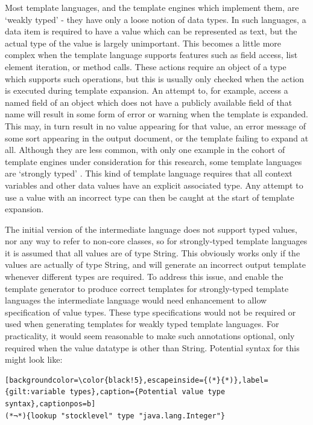 Most template languages, and the template engines which implement them, are `weakly typed' - they have only a loose notion of data types. In such languages, a data item is required to have a value which can be represented as text, but the actual type of the value is largely unimportant. This becomes a little more complex when the template language supports features such as field access, list element iteration, or method calls. These actions require an object of a type which supports such operations, but this is usually only checked when the action is executed during template expansion. An attempt to, for example, access a named field of an object which does not have a publicly available field of that name will result in some form of error or warning when the template is expanded. This may, in turn result in no value appearing for that value, an error message of some sort appearing in the output document, or the template failing to expand at all. Although they are less common, with only one example in the cohort of template engines under consideration for this research, some template languages are `strongly typed' \citep{Fokkinga1981} \citep{Madsen1990}. This kind of template language requires that all context variables and other data values have an explicit associated type. Any attempt to use a value with an incorrect type can then be caught at the start of template expansion.

The initial version of the intermediate language does not support typed values, nor any way to refer to non-core classes, so for strongly-typed template languages it is assumed that all values are of type String. This obviously works only if the values are actually of type String, and will generate an incorrect output template whenever different types are required. To address this issue, and enable the template generator to produce correct templates for strongly-typed template languages the intermediate language would need enhancement to allow specification of value types. These type specifications would not be required or used when generating templates for weakly typed template languages. For practicality, it would seem reasonable to make such annotations optional, only required when the value datatype is other than String. Potential syntax for this might look like:

\begin{lstlisting}[backgroundcolor=\color{black!5},escapeinside={(*}{*)},label={gilt:variable types},caption={Potential value type syntax},captionpos=b]
(*¬*){lookup "stocklevel" type "java.lang.Integer"}
\end{lstlisting}

